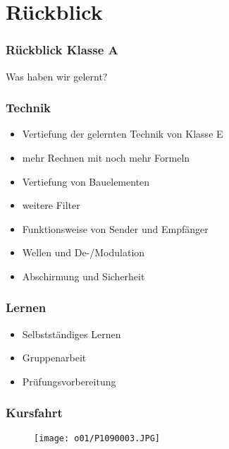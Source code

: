 

\usepackage{amssymb}
\subtitle{Organisatorisches 02\\ Abschluss Klasse A}
\date{Stand 20.03.2017}


\section{Rückblick}
\begin{frame}
  \frametitle{Rückblick Klasse A}
  \begin{center}
    {\Huge Was haben wir gelernt?}
  \end{center}
\end{frame}

\begin{frame}
  \frametitle{Technik}
  \begin{itemize}
    \item Vertiefung der gelernten Technik von Klasse E
    \item mehr Rechnen mit noch mehr Formeln
    \item Vertiefung von Bauelementen
    \item weitere Filter
    \item Funktionsweise von Sender und Empfänger
    \item Wellen und De-/Modulation
    \item Abschirmung und Sicherheit
  \end{itemize}
\end{frame}

\begin{frame}
  \frametitle{Lernen}
  \begin{itemize}
    \item Selbstständiges Lernen
    \item Gruppenarbeit 
    \item Prüfungsvorbereitung 
  \end{itemize}
\end{frame}

\begin{frame}
  \frametitle{Kursfahrt}
  \begin{center}
    \begin{figure}
      \texttt{[image: o01/P1090003.JPG]}
    \end{figure}
  \end{center}
\end{frame}

